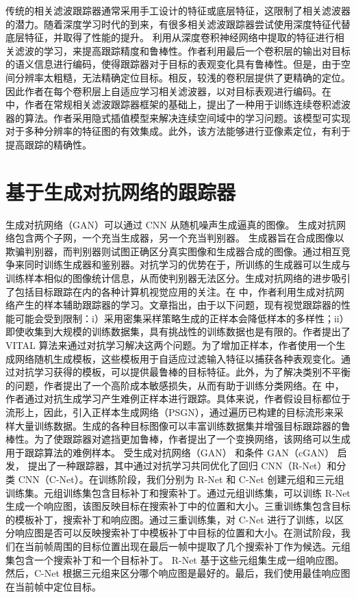 传统的相关滤波跟踪器通常采用手工设计的特征或底层特征，这限制了相关滤波器的潜力。随着深度学习时代的到来，有很多相关滤波跟踪器尝试使用深度特征代替底层特征，并取得了性能的提升。\cite{CF2} 利用从深度卷积神经网络中提取的特征进行相关滤波的学习，来提高跟踪精度和鲁棒性。作者利用最后一个卷积层的输出对目标的语义信息进行编码，使得跟踪器对于目标的表观变化具有鲁棒性。但是，由于空间分辨率太粗糙，无法精确定位目标。相反，较浅的卷积层提供了更精确的定位。因此作者在每个卷积层上自适应学习相关滤波器，以对目标表观进行编码。在 \cite{danelljan2016beyond} 中，作者在常规相关滤波跟踪器框架的基础上，提出了一种用于训练连续卷积滤波器的算法。作者采用隐式插值模型来解决连续空间域中的学习问题。该模型可实现对于多种分辨率的特征图的有效集成。此外，该方法能够进行亚像素定位，有利于提高跟踪的精确性。
\section{基于生成对抗网络的跟踪器}
生成对抗网络（GAN）可以通过 CNN 从随机噪声生成逼真的图像。 生成对抗网络包含两个子网，一个充当生成器，另一个充当判别器。 生成器旨在合成图像以欺骗判别器，而判别器则试图正确区分真实图像和生成器合成的图像。通过相互竞争来同时训练生成器和鉴别器。对抗学习的优势在于，所训练的生成器可以生成与训练样本相似的图像统计信息，从而使判别器无法区分。生成对抗网络的进步吸引了包括目标跟踪在内的各种计算机视觉应用的关注。在 \cite{VITAL} 中，作者利用生成对抗网络产生的样本辅助跟踪器的学习。文章指出，由于以下问题，现有视觉跟踪器的性能可能会受到限制：i）采用密集采样策略生成的正样本会降低样本的多样性；ii）即使收集到大规模的训练数据集，具有挑战性的训练数据也是有限的。作者提出了 VITAL 算法来通过对抗学习解决这两个问题。为了增加正样本，作者使用一个生成网络随机生成模板，这些模板用于自适应过滤输入特征以捕获各种表观变化。通过对抗学习获得的模板，可以提供最鲁棒的目标特征。此外，为了解决类别不平衡的问题，作者提出了一个高阶成本敏感损失，从而有助于训练分类网络。在 \cite{SINT++} 中，作者通过对抗生成学习产生难例正样本进行跟踪。具体来说，作者假设目标都位于流形上，因此，引入正样本生成网络（PSGN），通过遍历已构建的目标流形来采样大量训练数据。生成的各种目标图像可以丰富训练数据集并增强目标跟踪器的鲁棒性。为了使跟踪器对遮挡更加鲁棒，作者提出了一个变换网络，该网络可以生成用于跟踪算法的难例样本。%
受生成对抗网络（GAN）\cite{GAN} 和条件 GAN（cGAN）\cite{cGAN} 启发， \cite{AdversarialDeep} 提出了一种跟踪器，其中通过对抗学习共同优化了回归 CNN（R-Net）和分类 CNN（C-Net）。在训练阶段，我们分别为 R-Net 和 C-Net 创建元组和三元组训练集。元组训练集包含目标补丁和搜索补丁。通过元组训练集，可以训练 R-Net 生成一个响应图，该图反映目标在搜索补丁中的位置和大小。三重训练集包含目标的模板补丁，搜索补丁和响应图。通过三重训练集，对 C-Net 进行了训练，以区分响应图是否可以反映搜索补丁中模板补丁中目标的位置和大小。在测试阶段，我们在当前帧周围的目标位置出现在最后一帧中提取了几个搜索补丁作为候选。元组集包含一个搜索补丁和一个目标补丁。 R-Net 基于这些元组集生成一组响应图。然后，C-Net 根据三元组来区分哪个响应图是最好的。最后，我们使用最佳响应图在当前帧中定位目标。  %

